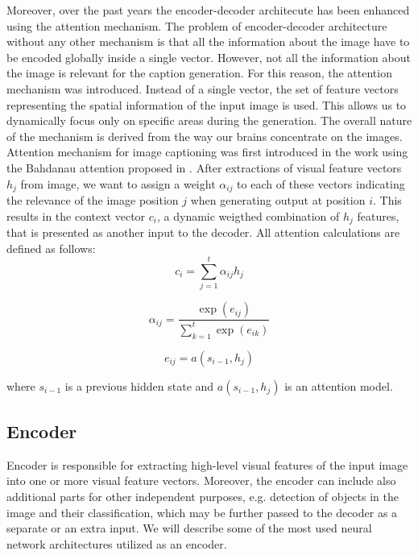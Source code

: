 Moreover, over the past years the encoder-decoder architecute has been enhanced using the attention mechanism. The problem of encoder-decoder architecture without any other mechanism is that all the information about the image have to be encoded globally inside a single vector. However, not all the information about the image is relevant for the caption generation. For this reason, the attention mechanism was introduced. Instead of a single vector, the set of feature vectors representing the spatial information of the input image is used. This allows us to dynamically focus only on specific areas during the generation. The overall nature of the mechanism is derived from the way our brains concentrate on the images.\\

Attention mechanism for image captioning was first introduced in the \citet{xu2015show} work using the Bahdanau attention proposed in \citet{bahdanau2014neural}. After extractions of visual feature vectors $h_j$ from image, we want to assign a weight $\alpha_{ij}$ to each of these vectors indicating the relevance of the image position $j$ when generating output at position $i$. This results in the context vector $c_i$, a dynamic weigthed combination of $h_j$ features, that is presented as another input to the decoder. All attention calculations are defined as follows:
\begin{equation}\label{eq01:AttContext}
	c_i = \sum_{j=1}^{t} \alpha_{ij} h_j
\end{equation}

\begin{equation}\label{eq01:AttWeights}
	\alpha_{ij} = \frac{\exp(e_{ij})}{\sum_{k=1}^{t} \exp(e_{ik})}
\end{equation}

\begin{equation}\label{eq01:AttFeedForwardNetwork}
	e_{ij} = a(s_{i-1}, h_j)
\end{equation}

where $s_{i-1}$ is a previous hidden state and $a(s_{i-1}, h_j)$ is an attention model.

\subsection{Encoder}
Encoder is responsible for extracting high-level visual features of the input image into one or more visual feature vectors. Moreover, the encoder can include also additional parts for other independent purposes, e.g. detection of objects in the image and their classification, which may be further passed to the decoder as a separate or an extra input. We will describe some of the most used neural network architectures utilized as an encoder.

